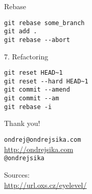 \documentclass{beamer}
\begin{document}
\begin{frame}[fragile]

    {\LARGE Rebase}\\

    \begin{verbatim}
git rebase some_branch
git add .
git rebase --abort
    \end{verbatim}

\end{frame}

\begin{frame}[fragile]

    {\LARGE 7. Refactoring}\\

    \begin{verbatim}
git reset HEAD~1
git reset --hard HEAD~1
git commit --amend
git commit --am
git rebase -i
    \end{verbatim}

\end{frame}

\begin{frame}

    {\LARGE Thank you!}\\

    \vspace{1cm}

    \texttt{ondrej@ondrejsika.com}\\
    \url{http://ondrejsika.com}\\
    \texttt{@ondrejsika}\\

    \vspace{1cm}

    Sources:\\
    \url{http://url.oxs.cz/eyelevel/}
\end{frame}
\end{document}
